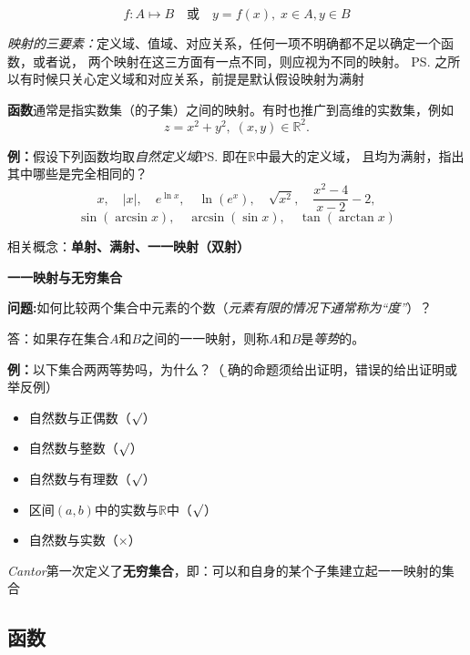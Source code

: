 $$f:A\mapsto B \quad\mbox{或}\quad y=f(x),\;x\in A,y\in B$$

{\it 映射的三要素：}定义域、值域、对应关系，任何一项不明确都不足以确定一个函数，或者说，
两个映射在这三方面有一点不同，则应视为不同的映射。
\ps{之所以有时候只关心定义域和对应关系，前提是默认假设映射为满射}

{\bf 函数}通常是指实数集（的子集）之间的映射。有时也推广到高维的实数集，例如
$$z=x^2+y^2,\;(x,y)\in\mathbb{R}^2.$$

{\bf 例：}假设下列函数均取{\it 自然定义域}\ps{即在$\mathbb{R}$中最大的定义域}，
且均为满射，指出其中哪些是完全相同的？
		$$x,\quad |x|,\quad e^{\ln x},\quad \ln(e^x),\quad \sqrt{x^2},\quad
		\frac{x^2-4}{x-2}-2,$$
		$$\sin(\arcsin x),\quad \arcsin(\sin x), \quad \tan(\arctan x)$$

相关概念：{\bf 单射、满射、一一映射（双射）}

\begin{shaded}
	{\bf 一一映射与无穷集合}
	
	{\bf 问题:}如何比较两个集合中元素的个数（{\it 元素有限的情况下通常称为“度”}）？
	
	答：如果存在集合$A$和$B$之间的一一映射，则称$A$和$B$是{\it 等势}的。
	
	{\bf 例：}以下集合两两等势吗，为什么？（{\b 正确的命题须给出证明，错误的给出证明或举反例}）
	\begin{itemize}
	  \setlength{\itemindent}{1cm}
	  \item 自然数与正偶数（{$\surd$}）
	  \item 自然数与整数（{$\surd$}）
	  \item 自然数与有理数（{$\surd$}）
	  \item 区间$(a,b)$中的实数与$\mathbb{R}$中（{$\surd$}）
	  \item 自然数与实数（{$\times$}）
	\end{itemize}
		
	{\it Cantor}第一次定义了{\b{\bf 无穷集合}，即：可以和自身的某个子集建立起一一映射的集合}
\end{shaded}	

	
\subsection{函数}
	
